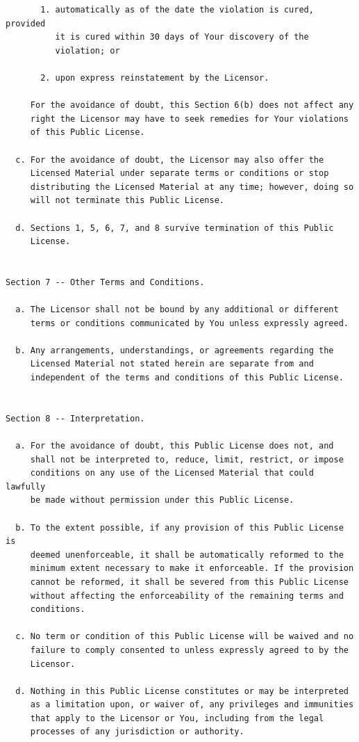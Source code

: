 \documentclass[12pt,spanish,]{scrartcl}
\begin{document}
\begin{verbatim}
       1. automatically as of the date the violation is cured, provided
          it is cured within 30 days of Your discovery of the
          violation; or

       2. upon express reinstatement by the Licensor.

     For the avoidance of doubt, this Section 6(b) does not affect any
     right the Licensor may have to seek remedies for Your violations
     of this Public License.

  c. For the avoidance of doubt, the Licensor may also offer the
     Licensed Material under separate terms or conditions or stop
     distributing the Licensed Material at any time; however, doing so
     will not terminate this Public License.

  d. Sections 1, 5, 6, 7, and 8 survive termination of this Public
     License.


Section 7 -- Other Terms and Conditions.

  a. The Licensor shall not be bound by any additional or different
     terms or conditions communicated by You unless expressly agreed.

  b. Any arrangements, understandings, or agreements regarding the
     Licensed Material not stated herein are separate from and
     independent of the terms and conditions of this Public License.


Section 8 -- Interpretation.

  a. For the avoidance of doubt, this Public License does not, and
     shall not be interpreted to, reduce, limit, restrict, or impose
     conditions on any use of the Licensed Material that could lawfully
     be made without permission under this Public License.

  b. To the extent possible, if any provision of this Public License is
     deemed unenforceable, it shall be automatically reformed to the
     minimum extent necessary to make it enforceable. If the provision
     cannot be reformed, it shall be severed from this Public License
     without affecting the enforceability of the remaining terms and
     conditions.

  c. No term or condition of this Public License will be waived and no
     failure to comply consented to unless expressly agreed to by the
     Licensor.

  d. Nothing in this Public License constitutes or may be interpreted
     as a limitation upon, or waiver of, any privileges and immunities
     that apply to the Licensor or You, including from the legal
     processes of any jurisdiction or authority.



\end{verbatim}
\end{document}

